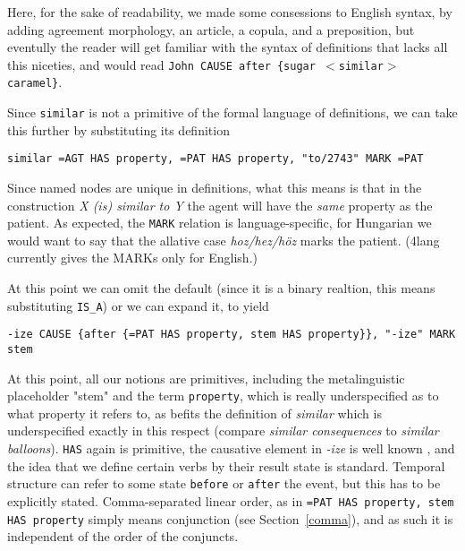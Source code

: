 \documentclass[11pt,bookmarks,bookmarksnumbered,naturalnames,plainpages=false,pdftex,colorlinks=true,urlcolor=blue,bookmarksdepth=subsection,plainpages=false]{paper}
\begin{document}
Here, for the sake of readability, we made some consessions to English syntax,
by adding agreement morphology, an article, a copula, and a preposition, but
eventully the reader will get familiar with the syntax of definitions that
lacks all this niceties, and would read {\tt John CAUSE after \{sugar $<$similar$>$
    caramel\}}. 


Since {\tt similar} is not a primitive of the formal language of definitions,
we can take this further by substituting its definition 

\begin{verbatim}
similar =AGT HAS property, =PAT HAS property, "to/2743" MARK =PAT
\end{verbatim}

\noindent
Since named nodes are unique in definitions, what this means is that in the
construction {\it X (is) similar to Y} the agent will have the {\it same}
property as the patient. As expected, the {\tt MARK} relation is
language-specific, for Hungarian we would want to say that the allative case
{\it hoz/hez/h\"{o}z} marks the patient. (4lang currently gives the MARKs only
for English.) 

At this point we can omit the default (since it is a binary realtion, this
means substituting {\tt IS\_A}) or we can expand it, to yield 

\begin{verbatim}
-ize CAUSE {after {=PAT HAS property, stem HAS property}}, "-ize" MARK stem
\end{verbatim}

\noindent At this point, all our notions are primitives, including the
metalinguistic placeholder "stem" and the term {\tt property}, which is really
underspecified as to what property it refers to, as befits the definition of
{\it similar} which is underspecified exactly in this respect (compare {\it
  similar consequences} to {\it similar balloons}). {\tt HAS} again is
primitive, the causative element in {\it -ize} is well known
\citep{Lieber:1992,Plag:1998}, and the idea that we define certain verbs by
their result state is standard. Temporal structure can refer to some state
{\tt before} or {\tt after} the event, but this has to be explicitly
stated. Comma-separated linear order, as in {\tt =PAT HAS property, stem HAS
  property} simply means conjunction (see Section~\ref{comma}), and as such 
it is independent of the order of the conjuncts. 
\end{document}
